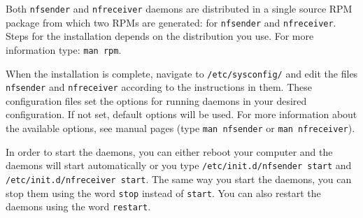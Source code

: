 \documentclass[11pt,a4paper]{article}
\begin{document}
Both \texttt{nf\textunderscore sender} and \texttt{nf\textunderscore receiver} daemons are distributed in a single source RPM package from which two RPMs are generated: for \texttt{nf\textunderscore sender} and \texttt{nf\textunderscore receiver}. Steps for the installation depends on the distribution you use. For more information type: \texttt{man rpm}.

When the installation is complete, navigate to \texttt{/etc/sysconfig/} and edit the files \texttt{nf\textunderscore sender} and \texttt{nf\textunderscore receiver} according to the instructions in them. These configuration files set the options for running daemons in your desired configuration. If not set, default options will be used. For more information about the available options, see manual pages (type \texttt{man nf\textunderscore sender} or \texttt{man nf\textunderscore receiver}).

In order to start the daemons, you can either reboot your computer and the daemons will start automatically or you type \texttt{/etc/init.d/nf\textunderscore sender start} and \texttt{/etc/init.d/nf\textunderscore receiver start}. The same way you start the daemons, you can stop them using the word \texttt{stop} instead of \texttt{start}. You can also restart the daemons using the word \texttt{restart}. 
\end{document}
